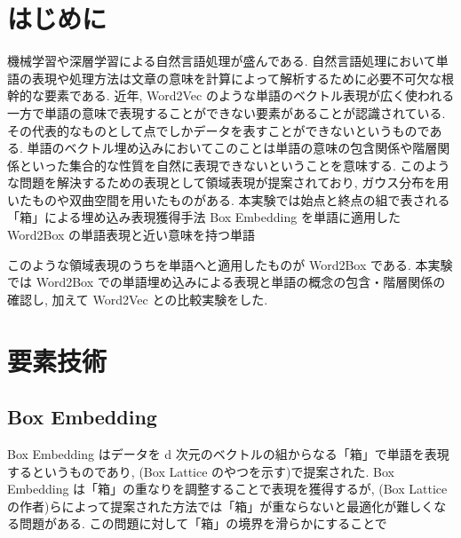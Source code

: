 \documentclass[twocolumn]{jarticle}     %
\begin{document}

\section{はじめに}
機械学習や深層学習による自然言語処理が盛んである. 
自然言語処理において単語の表現や処理方法は文章の意味を計算によって解析するために必要不可欠な根幹的な要素である.
近年, Word2Vec のような単語のベクトル表現が広く使われる一方で単語の意味で表現することができない要素があることが認識されている. 
その代表的なものとして点でしかデータを表すことができないというものである. 単語のベクトル埋め込みにおいてこのことは単語の意味の包含関係や階層関係といった集合的な性質を自然に表現できないということを意味する. 
このような問題を解決するための表現として領域表現が提案されており, ガウス分布を用いたものや双曲空間を用いたものがある. 本実験では始点と終点の組で表される「箱」による埋め込み表現獲得手法 Box Embedding を単語に適用した Word2Box の単語表現と近い意味を持つ単語

このような領域表現のうちを単語へと適用したものが Word2Box である. 本実験では Word2Box での単語埋め込みによる表現と単語の概念の包含・階層関係の確認し, 
加えて Word2Vec との比較実験をした.

\section{要素技術}
\subsection{Box Embedding}
Box Embedding はデータを d 次元のベクトルの組からなる「箱」で単語を表現するというものであり, (Box Lattice のやつを示す)で提案された.
Box Embedding は「箱」の重なりを調整することで表現を獲得するが, (Box Lattice の作者)らによって提案された方法では「箱」が重ならないと最適化が難しくなる問題がある.
この問題に対して「箱」の境界を滑らかにすることで
\end{document}
